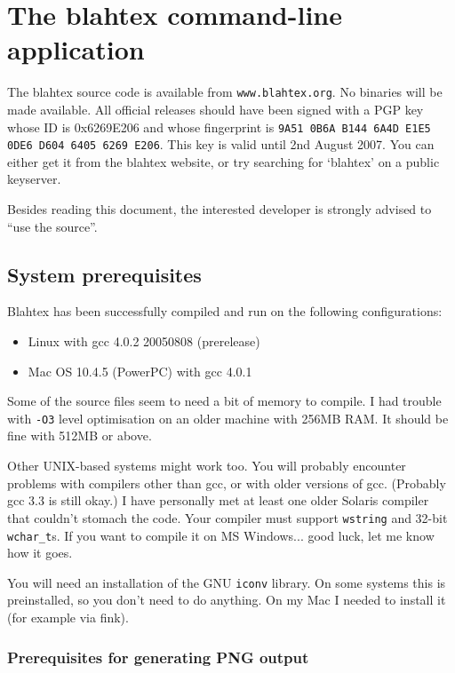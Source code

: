 \documentclass{article}
\begin{document}
\section{The blahtex command-line application}\label{sec:command-line}

The blahtex source code is available from \texttt{www.blahtex.org}. No binaries will be made available. All official releases should have been signed with a PGP key  whose ID is 0x6269E206 and whose fingerprint is \texttt{9A51 0B6A B144 6A4D E1E5 0DE6 D604 6405 6269 E206}. This key is valid until 2nd August 2007. You can either get it from the blahtex website, or try searching for `blahtex' on a public keyserver.

Besides reading this document, the interested developer is strongly advised to ``use the source''.

\subsection{System prerequisites}\label{sec:prerequisites}

Blahtex has been successfully compiled and run on the following configurations:
\begin{itemize}
\item Linux with gcc 4.0.2 20050808 (prerelease)
\item Mac OS 10.4.5 (PowerPC) with gcc 4.0.1
\end{itemize}

Some of the source files seem to need a bit of memory to compile. I had trouble with \texttt{-O3} level optimisation on an older machine with 256MB RAM. It should be fine with 512MB or above.

Other UNIX-based systems might work too. You will probably encounter problems with compilers other than gcc, or with older versions of gcc. (Probably gcc 3.3 is still okay.) I have personally met at least one older Solaris compiler that couldn't stomach the code. Your compiler must support \texttt{wstring} and 32-bit \texttt{wchar\_t}s. If you want to compile it on MS Windows... good luck, let me know how it goes.

You will need an installation of the GNU \texttt{iconv} library. On some systems this is preinstalled, so you don't need to do anything. On my Mac I needed to install it (for example via fink).

\subsubsection{Prerequisites for generating PNG output}
\end{document}
